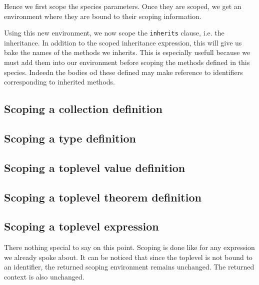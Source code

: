 Hence we first scope the species parameters. Once they are scoped, we
get an environment where they are bound to their scoping information.

Using this new environment, we now scope the {\tt inherits} clause,
i.e. the inheritance. In addition to the scoped inheritance
expression, this will give us bake the names of the methods we
inherits. This is especially usefull because we must add them into our
environment before scoping the methods defined in this
species. Indeedn the bodies od these defined may make reference to
identifiers corresponding to inherited methods.

\subsection{Scoping a collection definition}

\subsection{Scoping a type definition}

\subsection{Scoping a toplevel value definition}

\subsection{Scoping a toplevel theorem definition}

\subsection{Scoping a toplevel expression}
There nothing special to say on this point. Scoping is done like for
any expression we already spoke about. It can be noticed that since
the toplevel is not bound to an identifier, the returned scoping
environment remains unchanged. The returned context is also
unchanged.